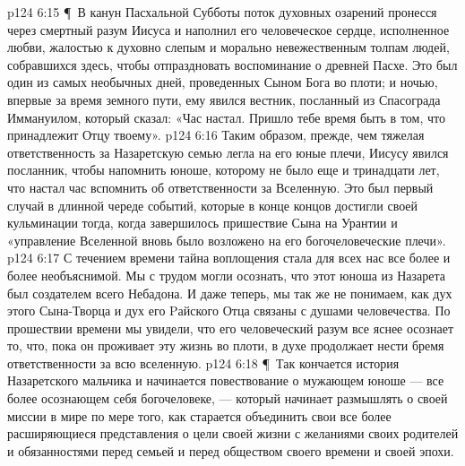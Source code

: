 \vs p124 6:15 \P\ В канун Пасхальной Субботы поток духовных озарений пронесся через смертный разум Иисуса и наполнил его человеческое сердце, исполненное любви, жалостью к духовно слепым и морально невежественным толпам людей, собравшихся здесь, чтобы отпраздновать воспоминание о древней Пасхе. Это был один из самых необычных дней, проведенных Сыном Бога во плоти; и ночью, впервые за время земного пути, ему явился вестник, посланный из Спасограда Иммануилом, который сказал: «Час настал. Пришло тебе время быть в том, что принадлежит Отцу твоему».
\vs p124 6:16 Таким образом, прежде, чем тяжелая ответственность за Назаретскую семью легла на его юные плечи, Иисусу явился посланник, чтобы напомнить юноше, которому не было еще и тринадцати лет, что настал час вспомнить об ответственности за Вселенную. Это был первый случай в длинной череде событий, которые в конце концов достигли своей кульминации тогда, когда завершилось пришествие Сына на Урантии и «управление Вселенной вновь было возложено на его богочеловеческие плечи».
\vs p124 6:17 С течением времени тайна воплощения стала для всех нас все более и более необъяснимой. Мы с трудом могли осознать, что этот юноша из Назарета был создателем всего Небадона. И даже теперь, мы так же не понимаем, как дух этого Сына\hyp{}Творца и дух его Pайского Отца связаны с душами человечества. По прошествии времени мы увидели, что его человеческий разум все яснее осознает то, что, пока он проживает эту жизнь во плоти, в духе продолжает нести бремя ответственности за всю вселенную.
\vs p124 6:18 \P\ Так кончается история Назаретского мальчика и начинается повествование о мужающем юноше --- все более осознающем себя богочеловеке, --- который начинает размышлять о своей миссии в мире по мере того, как старается объединить свои все более расширяющиеся представления о цели своей жизни с желаниями своих родителей и обязанностями перед семьей и перед обществом своего времени и своей эпохи.
